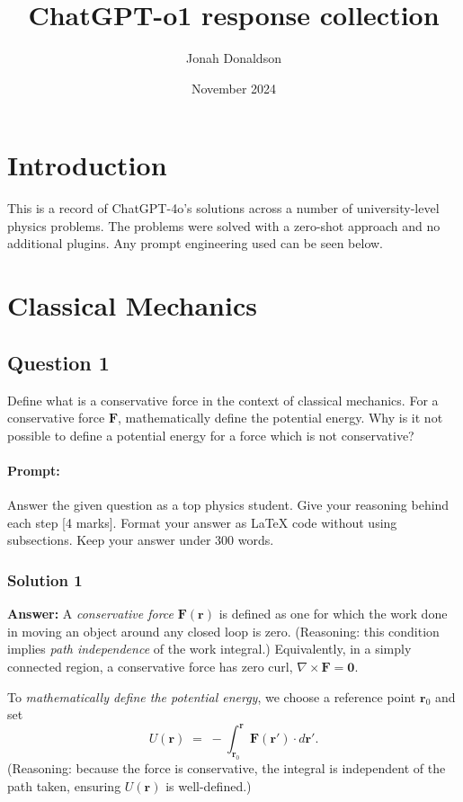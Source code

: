 \documentclass{article}
\title{ChatGPT-o1 response collection}
\author{Jonah Donaldson}
\date{November 2024}
\begin{document}
\maketitle

\tableofcontents
\newpage

\section{Introduction}

This is a record of ChatGPT-4o's solutions across a number of university-level physics problems. The problems were solved with a zero-shot approach and no additional plugins. Any prompt engineering used can be seen below.

\section{Classical Mechanics}

\subsection{Question 1}
Define what is a conservative force in the context of classical mechanics. For a conservative force $\mathbf{F}$, mathematically define the potential energy. Why is it not possible to define a potential energy for a force which is not conservative?

\paragraph{Prompt: \\} 
Answer the given question as a top physics student. Give your reasoning behind each step [4 marks].
Format your answer as LaTeX code without using subsections. Keep your answer under 300 words.

\subsubsection{Solution 1}
\textbf{Answer:} A \emph{conservative force} $\mathbf{F}(\mathbf{r})$ is defined as one for which the work done in moving an object around any closed loop is zero. (Reasoning: this condition implies \emph{path independence} of the work integral.) Equivalently, in a simply connected region, a conservative force has zero curl, $\nabla \times \mathbf{F} = \mathbf{0}$.

To \emph{mathematically define the potential energy}, we choose a reference point $\mathbf{r}_0$ and set
\[
U(\mathbf{r}) \;=\; - \int_{\mathbf{r}_0}^{\mathbf{r}} \mathbf{F}(\mathbf{r}') \cdot d\mathbf{r}'.
\]
(Reasoning: because the force is conservative, the integral is independent of the path taken, ensuring $U(\mathbf{r})$ is well-defined.)
\end{document}
